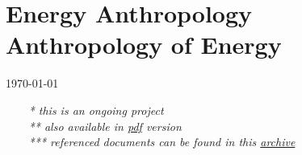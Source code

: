 \documentclass{article}
\begin{document}


\section*{\hspace*{74pt} Energy Anthropology\\ \hspace*{130pt} Anthropology of Energy}
\begin{center}
\today\
\end{center}

\begin{center}
  \it
~~~~* this is an ongoing project\\  
~~~~** also available in \href{https://hebdon.github.io/energy.pdf}{pdf} version\\
~~~~*** referenced documents can be found in this \href{https://drive.google.com/drive/folders/11VAyGIgfx7l57NQRRElpLsyMr8lY4bqq?usp=sharing}{archive}
  \end{center}
  
\end{document}
